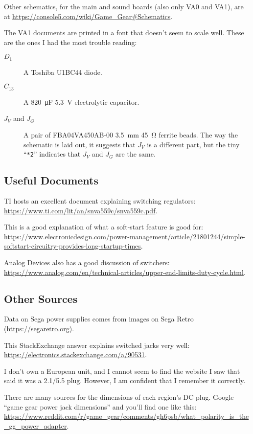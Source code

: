 \documentclass{article}
\newcommand{\model}{\textsf}
\begin{document}
Other schematics, for the main and sound boards (also only \model{VA0}
and \model{VA1}), are at
\url{https://console5.com/wiki/Game_Gear#Schematics}.

The \model{VA1} documents are printed in a font that doesn't seem to
scale well. These are the ones I had the most trouble reading:

\begin{description}
\item[$D_1$] A Toshiba \model{U1BC44} diode.
\item[$C_{13}$] A \qty{820}{\micro\farad} \qty{5.3}{\volt}
  electrolytic capacitor.
  
\item[$J_V$ and $J_G$] A pair of \model{FBA04VA450AB-00}
  \qty{3.5}{\milli\meter} \qty{45}{\ohm} ferrite beads. The way the
  schematic is laid out, it suggests that $J_V$ is a different part,
  but the tiny ``\texttt{*2}'' indicates that $J_V$ and $J_G$ are the
  same.
\end{description}

\subsection{Useful Documents}
TI hosts an excellent document explaining switching regulators:
\url{https://www.ti.com/lit/an/snva559c/snva559c.pdf}.

This is a good explanation of what a soft-start feature is good for:
\url{https://www.electronicdesign.com/power-management/article/21801244/simple-softstart-circuitry-provides-long-startup-times}.

Analog Devices also has a good discussion of switchers:
\url{https://www.analog.com/en/technical-articles/upper-end-limits-duty-cycle.html}.

\subsection{Other Sources}
\label{sec:other_sources}
Data on Sega power supplies comes from images on Sega Retro
(\url{https://segaretro.org}).

This Stack\-Ex\-change answer explains switched jacks very well:
\url{https://electronics.stackexchange.com/a/90531}.

I don't own a European unit, and I cannot seem to find the website I
saw that said it was a 2.1/5.5 plug. However, I am confident that I
remember it correctly.

There are many sources for the dimensions of each region's DC
plug. Google ``game gear power jack dimensions'' and you'll find one
like this:
\url{https://www.reddit.com/r/game_gear/comments/gh6psb/what_polarity_is_the_gg_power_adapter}.
\end{document}
